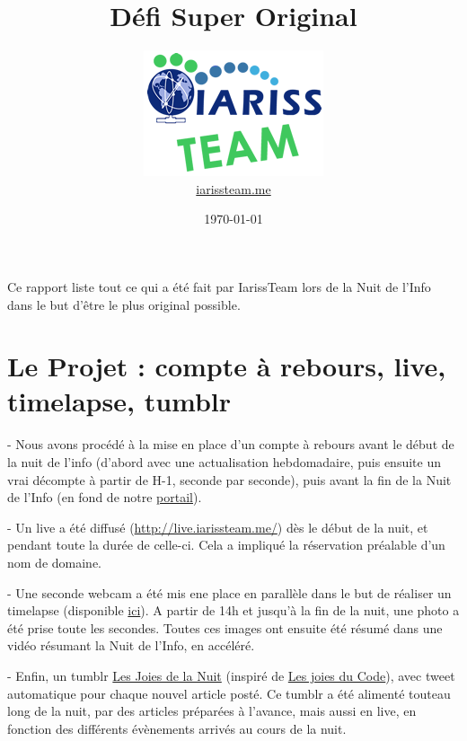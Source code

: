 \documentclass[12pt, a4paper]{article}
\title{Défi Super Original}
\newcommand{\espace}{\vspace{.8cm}}
\begin{document}
\author{\includegraphics{../_img/iariss_team.png} \\ {\sffamily \href{http://iarissteam.me}{iarissteam.me}}}
\date{\today}

\maketitle{}

{\sffamily Ce rapport liste tout ce qui a été fait par IarissTeam lors de la Nuit de l'Info dans le but d'être le plus original possible.} 

\espace{}
\section{Le Projet : compte à rebours, live, timelapse, tumblr}
 
- Nous avons procédé à la mise en place d'un compte à rebours avant le début de la nuit de l'info (d'abord avec une actualisation hebdomadaire, puis ensuite un vrai décompte à partir de H-1, seconde par seconde), puis avant la fin de la Nuit de l'Info (en fond de notre \href{http://iarissteam.me/}{portail}).

- Un live a été diffusé (\href{http://live.iarissteam.me/}{http://live.iarissteam.me/}) dès le début de la nuit, et pendant toute la durée de celle-ci. Cela a impliqué la réservation préalable d'un nom de domaine.

- Une seconde webcam a été mis ene place en parallèle dans le but de réaliser un timelapse (disponible \href{ici}{ici}). A partir de 14h et jusqu'à la fin de la nuit, une photo a été prise toute les secondes. Toutes ces images ont ensuite été résumé dans une vidéo résumant la Nuit de l'Info, en accéléré.

- Enfin, un tumblr \href{http://lesjoiesdelanuit.tumblr.com/}{Les Joies de la Nuit} (inspiré de \href{http://lesjoiesducode.tumblr.com/}{Les joies du Code}), avec tweet automatique pour chaque nouvel article posté. Ce tumblr a été alimenté touteau long de la nuit, par des articles préparées à l'avance, mais aussi en \og{}live\fg{}, en fonction des différents évènements arrivés au cours de la nuit.
\end{document}
